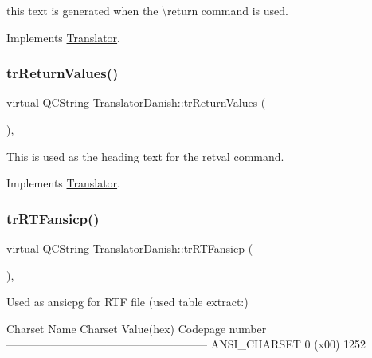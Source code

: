 this text is generated when the \textbackslash{}return command is used. 

Implements \mbox{\hyperlink{class_translator}{Translator}}.

\mbox{\label{class_translator_danish_a61066d9146eebf28cc0e9a3cdd3e63fe}} 
\subsubsection{\texorpdfstring{trReturnValues()}{trReturnValues()}}
{\footnotesize\ttfamily virtual \mbox{\hyperlink{class_q_c_string}{Q\+C\+String}} Translator\+Danish\+::tr\+Return\+Values (\begin{DoxyParamCaption}{ }\end{DoxyParamCaption})\hspace{0.3cm}{\ttfamily [inline]}, {\ttfamily [virtual]}}

This is used as the heading text for the retval command. 

Implements \mbox{\hyperlink{class_translator}{Translator}}.

\mbox{\label{class_translator_danish_a95baec5866d6291c86fd305c78d61dfe}} 
\subsubsection{\texorpdfstring{trRTFansicp()}{trRTFansicp()}}
{\footnotesize\ttfamily virtual \mbox{\hyperlink{class_q_c_string}{Q\+C\+String}} Translator\+Danish\+::tr\+R\+T\+Fansicp (\begin{DoxyParamCaption}{ }\end{DoxyParamCaption})\hspace{0.3cm}{\ttfamily [inline]}, {\ttfamily [virtual]}}

Used as ansicpg for R\+TF file (used table extract\+:) 
\begin{DoxyPre}
Charset Name       Charset Value(hex)  Codepage number
------------------------------------------------------
ANSI\_CHARSET              0 (x00)            1252
\end{DoxyPre}
 

